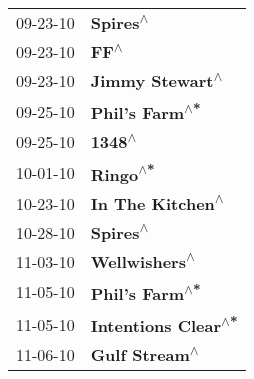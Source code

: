 \begin{supertabular}{p{0.25\columnwidth}p{0.75\columnwidth}}
 09-23-10 &                \textbf{Spires\textsuperscript{$\wedge$}} \\
 09-23-10 &                    \textbf{FF\textsuperscript{$\wedge$}} \\
 09-23-10 &         \textbf{Jimmy Stewart\textsuperscript{$\wedge$}} \\
 09-25-10 &          \textbf{Phil's Farm\textsuperscript{$\wedge$*}} \\
 09-25-10 &                  \textbf{1348\textsuperscript{$\wedge$}} \\
 10-01-10 &                \textbf{Ringo\textsuperscript{$\wedge$*}} \\
 10-23-10 &        \textbf{In The Kitchen\textsuperscript{$\wedge$}} \\
 10-28-10 &                \textbf{Spires\textsuperscript{$\wedge$}} \\
 11-03-10 &           \textbf{Wellwishers\textsuperscript{$\wedge$}} \\
 11-05-10 &          \textbf{Phil's Farm\textsuperscript{$\wedge$*}} \\
 11-05-10 &     \textbf{Intentions Clear\textsuperscript{$\wedge$*}} \\
 11-06-10 &           \textbf{Gulf Stream\textsuperscript{$\wedge$}} \\
\end{supertabular}
